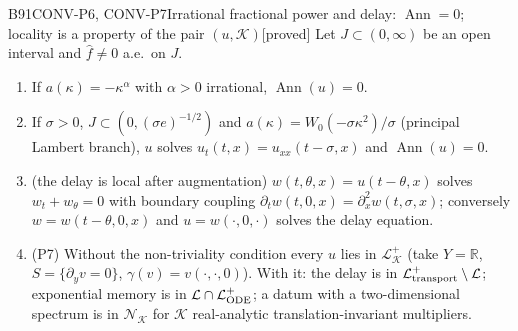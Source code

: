 \documentclass[11pt,a4paper,oneside]{report}
\newcommand{\badge}[2]{\textcolor{#1}{\textsf{\footnotesize[#2]}}}
\newcommand{\proved}{\badge{cC}{proved}}
\newcommand{\R}{\mathbb{R}}\newcommand{\C}{\mathbb{C}}\newcommand{\N}{\mathbb{N}}\newcommand{\Z}{\mathbb{Z}}\newcommand{\Q}{\mathbb{Q}}
\newcommand{\Ann}{\operatorname{Ann}}
\newenvironment{dimcard}[5]{\par\Needspace{12\baselineskip}\begin{dimcardbox}{#1}{#2}{#3}{#4}{#5}}{\end{dimcardbox}}
\begin{document}
\begin{dimcard}{B91}{CONV-P6, CONV-P7}{Irrational fractional power and delay: $\Ann=0$; locality is a property of the pair $(u,\mathcal K)$}{\proved}{}
Let $J\subset(0,\infty)$ be an open interval and $\hat f\ne0$ a.e.\ on $J$.
\begin{enumerate}[label=(\alph*)]
\item If $a(\kappa)=-\kappa^\alpha$ with $\alpha>0$ irrational, $\Ann(u)=0$.
\item If $\sigma>0$, $J\subset(0,(\sigma e)^{-1/2})$ and $a(\kappa)=W_0(-\sigma\kappa^2)/\sigma$ (principal Lambert branch), $u$ solves $u_t(t,x)=u_{xx}(t-\sigma,x)$ and $\Ann(u)=0$.
\item (the delay is local after augmentation) $w(t,\theta,x)=u(t-\theta,x)$ solves $w_t+w_\theta=0$ with boundary coupling $\partial_tw(t,0,x)=\partial_x^2w(t,\sigma,x)$; conversely $w=w(t-\theta,0,x)$ and $u=w(\cdot,0,\cdot)$ solves the delay equation.
\item (P7) Without the non-triviality condition every $u$ lies in $\mathcal L^+_{\mathcal K}$ (take $Y=\R$, $S=\{\partial_yv=0\}$, $\gamma(v)=v(\cdot,\cdot,0)$). With it: the delay is in $\mathcal L^+_{\rm transport}\setminus\mathcal L$; exponential memory is in $\mathcal L\cap\mathcal L^+_{\rm ODE}$; a datum with a two-dimensional spectrum is in $\mathcal N_{\mathcal K}$ for $\mathcal K$ real-analytic translation-invariant multipliers.
\end{enumerate}
\end{dimcard}
\end{document}
